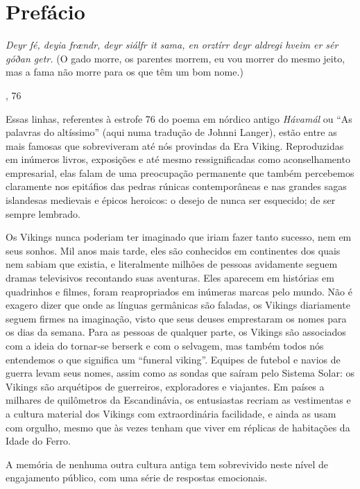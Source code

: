 \chapter[Prefácio, \emph{por Neil Price}]{Prefácio}\label{prefuxe1cio}

\epigraph{\emph{%
Deyr fé, deyia frændr, deyr siálfr it sama, en orztírr deyr aldregi
hveim er sér góðan getr.}\linebreak
(O gado morre, os parentes morrem, eu vou morrer do mesmo jeito, mas a
fama não morre para os que têm um bom nome.)}{, 76}

Essas linhas, referentes à estrofe 76 do poema em nórdico antigo
\emph{Hávamál} ou ``As palavras do altíssimo'' (aqui numa tradução de
Johnni Langer), estão entre as mais famosas que sobreviveram até nós
provindas da Era Viking. Reproduzidas em inúmeros livros, exposições e
até mesmo ressignificadas como aconselhamento empresarial, elas falam de
uma preocupação permanente que também percebemos claramente nos
epitáfios das pedras rúnicas contemporâneas e nas grandes sagas
islandesas medievais e épicos heroicos: o desejo de nunca ser esquecido; de ser sempre lembrado.

Os Vikings nunca poderiam ter imaginado que iriam fazer tanto sucesso,
nem em seus sonhos. Mil anos mais tarde, eles são conhecidos em
continentes dos quais nem sabiam que existia, e literalmente milhões
de pessoas avidamente seguem dramas televisivos recontando suas
aventuras. Eles aparecem em histórias em quadrinhos e filmes, foram
reapropriados em inúmeras marcas pelo mundo. Não é exagero dizer que
onde as línguas germânicas são faladas, os Vikings diariamente seguem
firmes na imaginação, visto que seus deuses emprestaram os nomes para os
dias da semana. Para as pessoas de qualquer parte, os Vikings são
associados com a ideia do tornar-se berserk e com o selvagem, mas também
todos nós entendemos o que significa um ``funeral viking''. Equipes de
futebol e navios de guerra levam seus nomes, assim como as sondas que
saíram pelo Sistema Solar: os Vikings são arquétipos de guerreiros,
exploradores e viajantes. Em países a milhares de quilômetros da
Escandinávia, os entusiastas recriam as vestimentas e a cultura material
dos Vikings com extraordinária facilidade, e ainda as usam com orgulho,
mesmo que às vezes tenham que viver em réplicas de habitações da Idade
do Ferro.

A memória de nenhuma outra cultura antiga tem sobrevivido neste nível de
engajamento público, com uma série de respostas emocionais.

